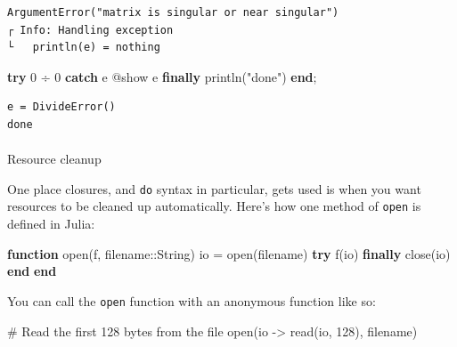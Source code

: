 \documentclass[
]{article}
\makeatletter
\let\oldparagraph\paragraph
\renewcommand{\paragraph}{
    \@ifstar
      \xxxParagraphStar
      \xxxParagraphNoStar
  }
\newcommand{\xxxParagraphStar}[1]{\oldparagraph*{#1}\mbox{}}
\newcommand{\xxxParagraphNoStar}[1]{\oldparagraph{#1}\mbox{}}
\newenvironment{Shaded}{\begin{snugshade}}{\end{snugshade}}
\newcommand{\CommentTok}[1]{\textcolor[rgb]{0.37,0.37,0.37}{#1}}
\newcommand{\ConstantTok}[1]{\textcolor[rgb]{0.56,0.35,0.01}{#1}}
\newcommand{\ControlFlowTok}[1]{\textcolor[rgb]{0.00,0.23,0.31}{\textbf{#1}}}
\newcommand{\DataTypeTok}[1]{\textcolor[rgb]{0.68,0.00,0.00}{#1}}
\newcommand{\FloatTok}[1]{\textcolor[rgb]{0.68,0.00,0.00}{#1}}
\newcommand{\FunctionTok}[1]{\textcolor[rgb]{0.28,0.35,0.67}{#1}}
\newcommand{\KeywordTok}[1]{\textcolor[rgb]{0.00,0.23,0.31}{\textbf{#1}}}
\newcommand{\NormalTok}[1]{\textcolor[rgb]{0.00,0.23,0.31}{#1}}
\newcommand{\OperatorTok}[1]{\textcolor[rgb]{0.37,0.37,0.37}{#1}}
\newcommand{\PreprocessorTok}[1]{\textcolor[rgb]{0.68,0.00,0.00}{#1}}
\newcommand{\StringTok}[1]{\textcolor[rgb]{0.13,0.47,0.30}{#1}}
\makeatother
\begin{document}
\begin{verbatim}
ArgumentError("matrix is singular or near singular")
┌ Info: Handling exception
└   println(e) = nothing
\end{verbatim}

\begin{Shaded}
\begin{Highlighting}[]
\ControlFlowTok{try}
   \FloatTok{0} \OperatorTok{÷} \FloatTok{0}
\ControlFlowTok{catch} \ConstantTok{e}
   \PreprocessorTok{@show} \ConstantTok{e}
\ControlFlowTok{finally}
   \FunctionTok{println}\NormalTok{(}\StringTok{"done"}\NormalTok{)}
\ControlFlowTok{end}\NormalTok{;}
\end{Highlighting}
\end{Shaded}

\begin{verbatim}
e = DivideError()
done
\end{verbatim}

\paragraph{Resource cleanup}\label{resource-cleanup}

One place closures, and \texttt{do} syntax in particular, gets used is
when you want resources to be cleaned up automatically. Here's how one
method of \texttt{open} is defined in Julia:

\begin{Shaded}
\begin{Highlighting}[]
\KeywordTok{function} \FunctionTok{open}\NormalTok{(f, filename}\OperatorTok{::}\DataTypeTok{String}\NormalTok{)}
\NormalTok{   io }\OperatorTok{=} \FunctionTok{open}\NormalTok{(filename)}
   \ControlFlowTok{try}
   \FunctionTok{f}\NormalTok{(io)}
   \ControlFlowTok{finally}
   \FunctionTok{close}\NormalTok{(io)}
   \ControlFlowTok{end}
\KeywordTok{end}
\end{Highlighting}
\end{Shaded}

You can call the \texttt{open} function with an anonymous function like
so:

\begin{Shaded}
\begin{Highlighting}[]
\CommentTok{\# Read the first 128 bytes from the file}
\FunctionTok{open}\NormalTok{(io }\OperatorTok{{-}\textgreater{}} \FunctionTok{read}\NormalTok{(io, }\FloatTok{128}\NormalTok{), filename)}
\end{Highlighting}
\end{Shaded}
\end{document}
